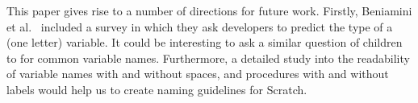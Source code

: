 \documentclass[conference]{IEEEtran}
\begin{document}
This paper gives rise to a number of directions for future work. Firstly, Beniamini et al.~\cite{Beniamini} included a survey in which they ask developers to predict the type of a (one letter) variable. It could be interesting to ask a similar question of children to for common variable names. Furthermore, a detailed study into the readability of variable names with and without spaces, and procedures with and without labels would help us to create naming guidelines for Scratch.









%

\end{document}
